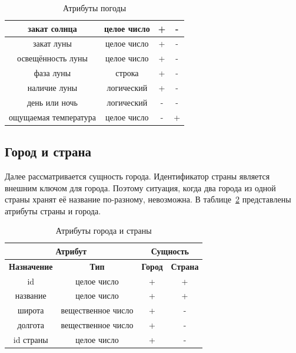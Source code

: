 \begin{table}[H]
\begin{tabular}{ |c|c|c|c| }
        \hline
             закат солнца & целое число & + & - \\
        \hline
             закат луны & целое число & + & - \\
        \hline
             освещённость луны & целое число & + & - \\
        \hline
             фаза луны & строка & + & - \\
        \hline
             наличие луны & логический & + & - \\
        \hline
            день или ночь & логический & - & - \\
        \hline
            ощущаемая температура & целое число & - & + \\
        \hline
            
    \end{tabular}
    \caption{\centering Атрибуты погоды}
    \label{table:weather_attr}
\end{table}

\subsection*{Город и страна}
Далее рассматривается сущность города.
Идентификатор страны является внешним ключом для города.
Поэтому ситуация, когда два города из одной страны хранят её название по-разному, невозможна.
В таблице~\ref{table:city_attr} представлены атрибуты страны и города.
\begin{table}[H]
    \centering
    \begin{tabular}{ |c|c|c|c| }
        \hline
        \multicolumn{2}{|c|}{Атрибут} & \multicolumn{2}{|c|}{Сущность}  \\
        \hline
            \textbf{Назначение} & \textbf{Тип} & \textbf{Город} & \textbf{Страна} \\
        \hline
            id & целое число & + & + \\
        \hline
            название & целое число & + & + \\
        \hline
            широта & вещественное число & + & - \\
        \hline
            долгота & вещественное число & + & - \\
        \hline
            id страны & целое число & + & - \\
        \hline
            
    \end{tabular}
    \caption{\centering Атрибуты города и страны}
    \label{table:city_attr}
\end{table}


